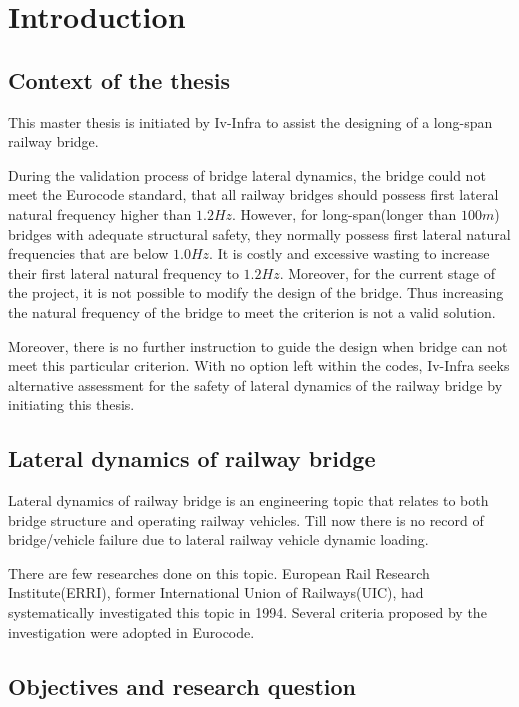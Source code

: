 

\chapter{Introduction}

\section{Context of the thesis}
This master thesis is initiated by Iv-Infra to assist the designing of a long-span railway bridge. 

During the validation process of bridge lateral dynamics, the bridge could not meet the Eurocode standard, that all railway bridges should possess first lateral natural frequency higher than $1.2Hz$. However, for long-span(longer than $100m$) bridges with adequate structural safety, they normally possess first lateral natural frequencies that are below $1.0Hz$. It is costly and excessive wasting to increase their first lateral natural frequency to $1.2Hz$. Moreover, for the current stage of the project, it is not possible to modify the design of the bridge. Thus increasing the natural frequency of the bridge to meet the criterion is not a valid solution.

Moreover, there is no further instruction to guide the design when bridge can not meet this particular criterion. With no option left within the codes, Iv-Infra seeks alternative assessment for the safety of lateral dynamics of the railway bridge by initiating this thesis. 

\section{Lateral dynamics of railway bridge}
Lateral dynamics of railway bridge is an engineering topic that relates to both bridge structure and operating railway vehicles. Till now there is no record of bridge/vehicle failure due to lateral railway vehicle dynamic loading. 

There are few researches done on this topic. European Rail Research Institute(ERRI), former International Union of Railways(UIC), had systematically investigated this topic in 1994. Several criteria proposed by the investigation were adopted in Eurocode. 

\section{Objectives and research question}\label{sec:introduction}

